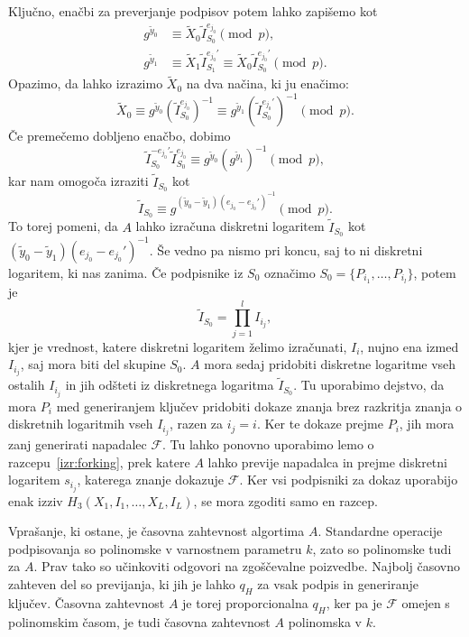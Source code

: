 \documentclass[isrm2, tisk]{fmfdelo}
\begin{document}
Ključno, enačbi za preverjanje podpisov potem lahko zapišemo kot
\begin{align*}
    g^{\tilde{y}_0} &\equiv \tilde{X}_0 \tilde{I}_{S_0}^{e_{j_0}} \pmod p, \\
    g^{\tilde{y}_1} &\equiv \tilde{X}_1 \tilde{I}_{S_1}^{e_{j_0}'}
        \equiv \tilde{X}_0 \tilde{I}_{S_0}^{e_{j_0}'} \pmod p.
\end{align*}
Opazimo, da lahko izrazimo $\tilde{X}_0$ na dva načina, ki ju enačimo:
$$
\tilde{X}_0 \equiv g^{\tilde{y}_0}(\tilde{I}_{S_0}^{e_{j_0}})^{-1}
    \equiv g^{\tilde{y}_1}(\tilde{I}_{S_0}^{e_{j_0}'})^{-1} \pmod p.
$$
Če premečemo dobljeno enačbo, dobimo
$$
\tilde{I}_{S_0}^{- e_{j_0}'} \tilde{I}_{S_0}^{e_{j_0}} \equiv g^{\tilde{y}_0}(g^{\tilde{y}_1})^{-1} \pmod p,
$$
kar nam omogoča izraziti $\tilde{I}_{S_0}$ kot
$$
\tilde{I}_{S_0} \equiv g^{(\tilde{y}_0 - \tilde{y}_1) (e_{j_0} - e_{j_0}')^{-1}} \pmod p.
$$
To torej pomeni, da $A$ lahko izračuna diskretni logaritem $\tilde{I}_{S_0}$ kot 
$(\tilde{y}_0 - \tilde{y}_1) (e_{j_0} - e_{j_0}')^{-1}$. Še vedno pa nismo pri koncu, saj to ni
diskretni logaritem, ki nas zanima. Če podpisnike iz $S_0$ označimo $S_0 = \{P_{i_1}, \dots, P_{i_l}\}$,
potem je 
$$
\tilde{I}_{S_0} = \prod_{j=1}^l I_{i_j},
$$
kjer je vrednost, katere diskretni logaritem želimo izračunati, $I_i$, nujno ena izmed $I_{i_j}$, 
saj mora biti del skupine $S_0$. $A$ mora sedaj pridobiti diskretne logaritme vseh ostalih $I_{i_j}$
in jih odšteti iz diskretnega logaritma $\tilde{I}_{S_0}$. Tu uporabimo dejstvo, da mora $P_i$ med
generiranjem ključev pridobiti dokaze znanja brez razkritja znanja o diskretnih logaritmih vseh $I_{i_j}$,
razen za $i_j = i$. Ker te dokaze prejme $P_i$, jih mora zanj generirati napadalec $\mathcal{F}$. Tu
lahko ponovno uporabimo lemo o razcepu~\ref{izr:forking}, prek katere $A$ lahko previje napadalca
in prejme diskretni logaritem $s_{i_j}$, katerega znanje dokazuje $\mathcal{F}$. Ker vsi podpisniki
za dokaz uporabijo enak izziv $H_3(X_1, I_1, \dots, X_L, I_L)$, se mora zgoditi samo en razcep.

Vprašanje, ki ostane, je časovna zahtevnost algortima $A$. Standardne operacije podpisovanja
so polinomske v varnostnem parametru $k$, zato so polinomske tudi za $A$. Prav tako so učinkoviti
odgovori na zgoščevalne poizvedbe. Najbolj časovno zahteven del so previjanja, ki jih je lahko $q_H$
za vsak podpis in generiranje ključev. Časovna zahtevnost $A$ je torej proporcionalna $q_H$, ker pa
je $\mathcal{F}$ omejen s polinomskim časom, je tudi časovna zahtevnost $A$ polinomska v $k$.
\end{document}
